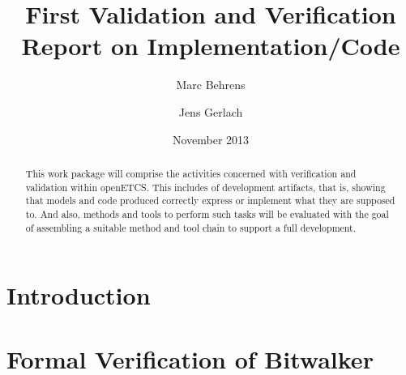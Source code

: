 \documentclass{template/openetcs_article}
\begin{document}
\frontmatter
{}




\title{First Validation and Verification Report on Implementation/Code}


\date{November 2013}


\author{Marc Behrens}

 
\author{Jens Gerlach}






\begin{abstract}

  This work package will comprise the activities concerned with
  verification and validation within openETCS. This includes \vv of
  development artifacts, that is, showing that models and code
  produced correctly express or implement what they are supposed
  to. And also, methods and tools to perform such tasks will be
  evaluated with the goal of assembling a suitable method and tool
  chain to support a full development.

\end{abstract}

\maketitle
\tableofcontents
\listoffiguresandtables
\newpage




\section{Introduction}
\section{Formal Verification of Bitwalker}

\nocite{*}
\end{document}
